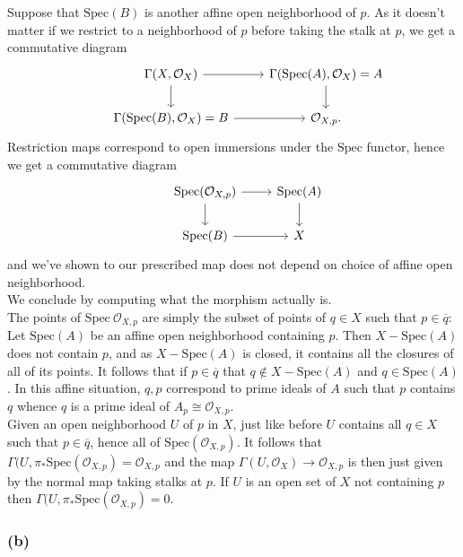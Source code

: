 \documentclass{article}
\theoremstyle{definition}
\newcommand{\Spec}{\text{Spec}}
\begin{document}
Suppose that $\Spec(B)$ is another affine open neighborhood of $p$. As it
doesn't matter if we restrict to a neighborhood of $p$ before taking the stalk
at $p$, we get a commutative diagram
\[
	\begin{tikzcd}
		& \Gamma(X, \mathcal{O}_X)
		\ar[r]
		\ar[d]
		& \Gamma(\Spec(A), \mathcal{O}_X) = A
		\ar[d] \\
		& \Gamma(\Spec(B), \mathcal{O}_X) = B
		\ar[r]
		& \mathcal{O}_{X, p}.
	\end{tikzcd}
\]
Restriction maps correspond to open immersions under the $\Spec$ functor, hence we get a commutative diagram
\[
	\begin{tikzcd}
		& \Spec(\mathcal{O}_{X, p})
		\ar[r]
		\ar[d]
		& \Spec(A)
		\ar[d] \\
		& \Spec(B)
		\ar[r]
		&
		X
	\end{tikzcd}
\]
and we've shown to our prescribed map does not depend on choice of affine open
neighborhood. \\

We conclude by computing what the morphism actually is. \\

The points of $\Spec\ \mathcal{O}_{X, p}$ are simply the subset of points of $q
	\in X$ such that $p \in \overline{q}$: Let $\Spec(A)$ be an affine open
neighborhood containing $p$. Then $X - \Spec(A)$ does not contain $p$, and as
$X - \Spec(A)$ is closed, it contains all the closures of all of its points. It
follows that if $p \in \overline{q}$ that $q \not \in X - \Spec(A)$ and $q \in
	\Spec(A)$. In this affine situation, $q, p$ correspond to prime ideals of $A$
such that $p$ contains $q$ whence $q$ is a prime ideal of $A_{p} \cong
	\mathcal{O}_{X, p}$. \\

Given an open neighborhood $U$ of $p$ in $X$, just like before $U$ contains all
$q \in X$ such that $p \in \overline{q}$, hence all of $\Spec(\mathcal{O}_{X,
		p})$. It follows that $\Gamma(U, \pi_{*}\Spec(\mathcal{O}_{X, p}) =
	\mathcal{O}_{X, p}$ and the map $\Gamma(U, \mathcal{O}_X) \to \mathcal{O}_{X,
		p}$ is then just given by the normal map taking stalks at $p$. If $U$ is an
open set of $X$ not containing $p$ then $\Gamma(U, \pi_{*}\Spec(\mathcal{O}_{X,
		p}) = 0$. \\


\subsubsection*{(b)}
\end{document}
